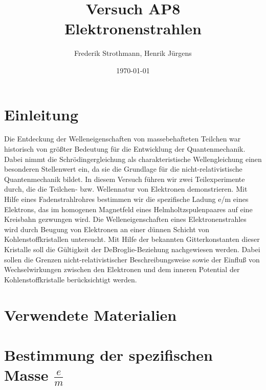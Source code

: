 \documentclass[12pt,a4paper]{article}
\title{Versuch AP8\\ Elektronenstrahlen}
\author{Frederik Strothmann, Henrik Jürgens}
\date{\today}
\begin{document}
\maketitle
\newpage
\tableofcontents
\newpage
\section{Einleitung}
Die Entdeckung der Welleneigenschaften von massebehafteten Teilchen war historisch von größter Bedeutung
für die Entwicklung der Quantenmechanik. Dabei nimmt die Schrödingergleichung als charakteristische Wellengleichung einen besonderen Stellenwert ein, da sie die Grundlage für die nicht-relativistische Quantenmechanik
bildet. In diesem Versuch führen wir zwei Teilexperimente durch, die die Teilchen- bzw. Wellennatur von Elektronen demonstrieren. Mit Hilfe eines Fadenstrahlrohres bestimmen wir die spezifische Ladung e/m eines Elektrons, das im homogenen Magnetfeld eines Helmholtzspulenpaares auf eine Kreisbahn gezwungen wird.
Die Welleneigenschaften eines Elektronenstrahles wird durch Beugung von Elektronen an einer dünnen Schicht von Kohlenstoffkristallen untersucht. Mit Hilfe der bekannten Gitterkonstanten dieser Kristalle soll
die Gültigkeit der DeBroglie-Beziehung nachgewiesen werden. Dabei sollen die Grenzen nicht-relativistischer
Beschreibungsweise sowie der Einfluß von Wechselwirkungen zwischen den Elektronen und dem inneren Potential der Kohlenstoffkristalle berücksichtigt werden.
\section{Verwendete Materialien}
\section{Bestimmung der spezifischen Masse $\frac{e}{m}$}
\end{document}
